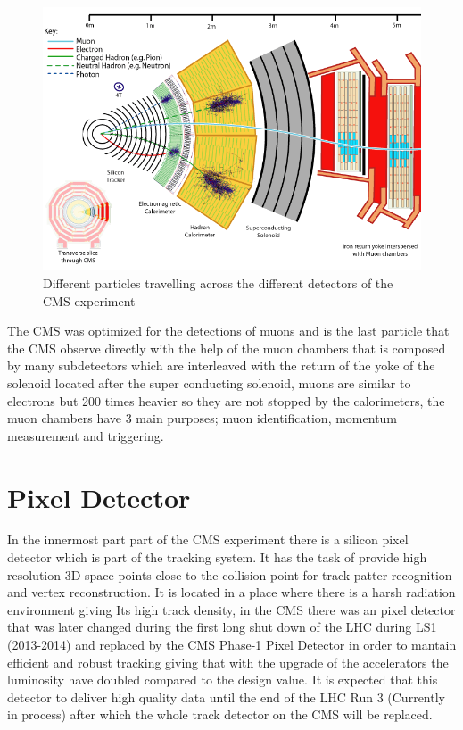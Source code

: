 \begin{figure}[H]
    \centering
    \includegraphics[width=1\textwidth]{cms.png}
     \caption{Different particles travelling across the different detectors of the CMS experiment}
    \label{fig:four-forces}
\end{figure}


The CMS was optimized for the detections of muons and is the last particle that the CMS observe directly with the help of the muon chambers that is composed by many subdetectors which are interleaved with the return of the yoke of the solenoid located after the super conducting solenoid, muons are similar to electrons but 200 times heavier so they are not stopped by the calorimeters, the muon chambers have 3 main purposes; muon identification, momentum measurement and triggering. \cite{CMS2}

\section{Pixel Detector}

In the innermost part part of the CMS experiment there is a silicon pixel detector which is part of the tracking system. It has the task of provide high resolution 3D space points close to the collision point for track patter recognition and vertex reconstruction. It is located in a place where there is a harsh radiation environment giving Its high track density, in the CMS there was an pixel detector that was later changed during the first long shut down of the LHC during LS1 (2013-2014) and replaced by the CMS Phase-1 Pixel Detector in order to mantain efficient and robust tracking giving that with the upgrade of the accelerators the luminosity have doubled compared to the design value. It is expected that this detector to deliver high quality data until the end of the LHC Run 3 (Currently in process) after which the whole track detector on the CMS will be replaced.
   
